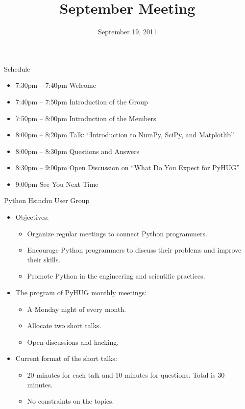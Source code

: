 \documentclass[dvips,xcolor=pst]{beamer}
\title{September Meeting}
\institute{Python Hsinchu User Group}
\date[2011/9/19]{September 19, 2011}
\begin{document}
\begin{frame}
\titlepage
\end{frame}

\begin{frame}{
%
Schedule
%
}
\begin{itemize} \large
  \item 7:30pm -- 7:40pm Welcome
  \item 7:40pm -- 7:50pm Introduction of the Group
  \item 7:50pm -- 8:00pm Introduction of the Members
  \item 8:00pm -- 8:20pm Talk: ``Introduction to NumPy, SciPy, and Matplotlib''
  \item 8:00pm -- 8:30pm Questions and Answers
  \item 8:30pm -- 9:00pm Open Discussion on ``What Do You Expect for PyHUG''
  \item 9:00pm See You Next Time
\end{itemize}
\end{frame}

\begin{frame}{
%
Python Hsinchu User Group
%
}
\begin{itemize} \large
  \item Objectives:
  \begin{itemize} \large
    \item Organize regular meetings to connect Python programmers.
    \item Encourage Python programmers to discuss their problems and improve
    their skills.
    \item Promote Python in the engineering and scientific practices.
  \end{itemize}
  \item The program of PyHUG monthly meetings:
  \begin{itemize} \large
    \item A Monday night of every month.
    \item Allocate two short talks.
    \item Open discussions and hacking.
  \end{itemize}
  \item Current format of the short talks:
  \begin{itemize} \large
    \item 20 minutes for each talk and 10 minutes for questions.  Total is 30
    minutes.
    \item No constraints on the topics.
  \end{itemize}
\end{itemize}
\end{frame}
\end{document}
